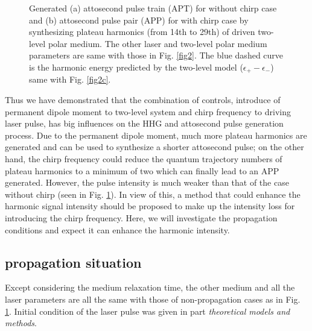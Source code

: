 \documentclass[10pt,letterpaper]{article}
\begin{document}
\begin{figure}[!htbp]
	\centering
	\caption{Generated (a) attosecond pulse train (APT) for without chirp case and (b) attosecond pulse pair (APP) for with chirp case by synthesizing plateau harmonics (from 14th to 29th) of driven two-level polar medium. The other laser and two-level polar medium parameters are same with those in Fig. \ref{fig2}. The blue dashed curve is the harmonic energy predicted by the two-level model ($\epsilon_{+}-\epsilon_{-}$) same with Fig. \ref{fig2c}.}
	\label{fig3}
\end{figure}
	
Thus we have demonstrated that the combination of controls, introduce of permanent dipole moment to two-level system and chirp frequency to driving laser pulse, has big influences on the HHG and attosecond pulse generation process. Due to the permanent dipole moment, much more plateau harmonics are generated and can be used to synthesize a shorter attosecond pulse; on the other hand, the chirp frequency could reduce the quantum trajectory numbers of plateau harmonics to a minimum of two which can finally lead to an APP generated. However, the pulse intensity is much weaker than that of the case without chirp (seen in Fig. \ref{fig3}). In view of this, a method that could enhance the harmonic signal intensity should be proposed to make up the intensity loss for introducing the chirp frequency. Here, we will investigate the propagation conditions and expect it can enhance the harmonic intensity. 
\subsection{propagation situation}
Except considering the medium relaxation time, the other medium and all the laser parameters are all the same with those of non-propagation cases as in Fig. \ref{fig3}. Initial condition of the laser pulse was given in part \emph{theoretical models and methods}. 
\end{document}
